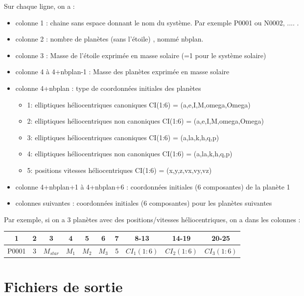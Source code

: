 \documentclass[11pt]{article}
\begin{document}
Sur chaque ligne, on a :
\begin{itemize}
\item colonne 1 : chaine sans espace donnant le nom du syst\`eme. Par exemple P0001 ou N0002, .... .
\item colonne 2 : nombre de plan\`etes (sans l'\'etoile) , nomm\'e nbplan.
\item colonne 3 : Masse de  l'\'etoile exprimée en masse solaire (=1 pour le système solaire)
\item colonne 4 \`a 4+nbplan-1 :  Masse des plan\`etes exprimée en masse solaire 
\item colonne 4+nbplan : type de coordonn\'ees initiales des plan\`etes
\begin{itemize}
\item 1:  elliptiques h\'eliocentriques canoniques
	     CI(1:6) = (a,e,I,M,omega,Omega)
\item 2:  elliptiques h\'eliocentriques non canoniques
	     CI(1:6) = (a,e,I,M,omega,Omega)
\item 3:  elliptiques h\'eliocentriques canoniques
	     CI(1:6) = (a,la,k,h,q,p)
\item 4:  elliptiques h\'eliocentriques non canoniques
	     CI(1:6) = (a,la,k,h,q,p)
\item 5:  positions vitesses h\'eliocentriques
	     CI(1:6) = (x,y,z,vx,vy,vz)
\end{itemize}

\item colonne 4+nbplan+1 \`a  4+nbplan+6 :   coordonn\'ees initiales (6 composantes) de la plan\`ete 1
\item  colonnes suivantes :   coordonn\'ees initiales (6 composantes) pour les plan\`etes suivantes
\end{itemize}

 Par exemple, si on a 3 plan\`etes avec des positions/vitesses h\'eliocentriques, on a dans les colonnes :
 
\begin{tabular}{|c|c|c|c|c|c|c|c|c|c|} \hline
1 &  2 &  3 & 4 & 5 &6 &7 &8-13 &14-19 &20-25 \\ \hline
P0001 & 3 & $M_{star}$  & $M_1$ &  $M_2$ & $M_3$  &5 &$CI_1(1:6)$ & $CI_2(1:6)$&$CI_3(1:6)$\\    \hline
\end{tabular}

\section{Fichiers de sortie}
\end{document}
